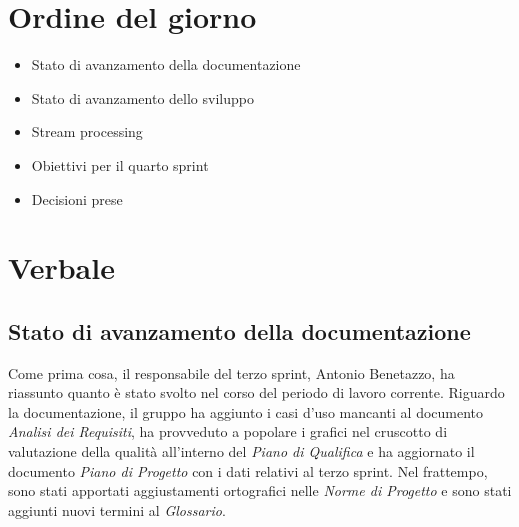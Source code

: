 \documentclass[italian,12pt]{article}
\begin{document}
\section{Ordine del giorno}
\begin{itemize}
	\item Stato di avanzamento della documentazione
	\item Stato di avanzamento dello sviluppo
	\item Stream processing
	\item Obiettivi per il quarto sprint
	\item Decisioni prese
\end{itemize}

\newpage

\section{Verbale}

\subsection{Stato di avanzamento della documentazione}
Come prima cosa, il responsabile del terzo sprint, Antonio Benetazzo, ha riassunto quanto è stato svolto nel corso del periodo di lavoro corrente.
Riguardo la documentazione, il gruppo ha aggiunto i casi d'uso mancanti al documento \textit{Analisi dei Requisiti}, 
ha provveduto a popolare i grafici nel cruscotto di valutazione della qualità all'interno del \textit{Piano di Qualifica} e
ha aggiornato il documento \textit{Piano di Progetto} con i dati relativi al terzo sprint. Nel frattempo, sono stati apportati aggiustamenti
ortografici nelle \textit{Norme di Progetto} e sono stati aggiunti nuovi termini al \textit{Glossario}.
\end{document}
